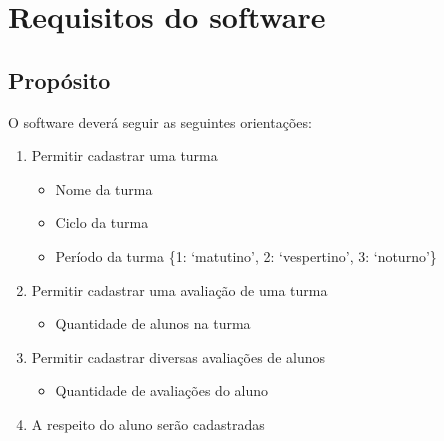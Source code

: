 \documentclass[a4paper,12pt]{report}
\begin{document}
    \chapter{Requisitos do software}

        \section{Propósito}
        O software deverá seguir as seguintes orientações:

        \begin{enumerate}

            \item Permitir cadastrar uma turma

                \begin{itemize}

                    \item Nome da turma

                    \item Ciclo da turma

                    \item Período da turma \{1: `matutino', 2: `vespertino',
                        3: `noturno'\}

                \end{itemize}

            \item Permitir cadastrar uma avaliação de uma turma

                \begin{itemize}

                    \item Quantidade de alunos na turma

                \end{itemize}

            \item Permitir cadastrar diversas avaliações de alunos

                \begin{itemize}

                    \item Quantidade de avaliações do aluno

                \end{itemize}

            \item A respeito do aluno serão cadastradas

                \begin{itemize}


\end{itemize}
\end{enumerate}
\end{document}

